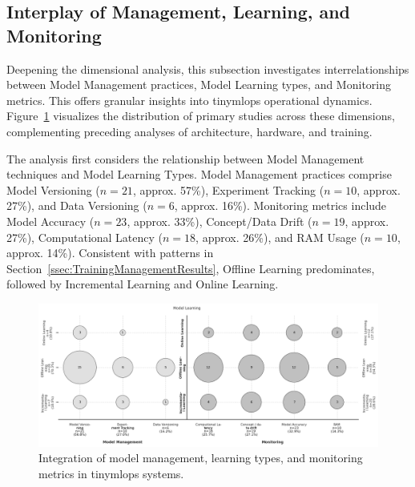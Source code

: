 \subsection{Interplay of Management, Learning, and Monitoring}
\label{ssec:ManagementLearningMonitoringResults}

Deepening the dimensional analysis, this subsection investigates interrelationships between Model Management practices, Model Learning types, and Monitoring metrics. This offers granular insights into \gls{tinymlops} operational dynamics. Figure~\ref{fig:bubble-chart-mgmt-learning-monitoring} visualizes the distribution of primary studies across these dimensions, complementing preceding analyses of architecture, hardware, and training.

The analysis first considers the relationship between Model Management techniques and Model Learning Types. Model Management practices comprise Model Versioning ($n=21$, approx. 57\%), Experiment Tracking ($n=10$, approx. 27\%), and Data Versioning ($n=6$, approx. 16\%). Monitoring metrics include Model Accuracy ($n=23$, approx. 33\%), Concept/Data Drift ($n=19$, approx. 27\%), Computational Latency ($n=18$, approx. 26\%), and RAM Usage ($n=10$, approx. 14\%). Consistent with patterns in Section~\ref{ssec:TrainingManagementResults}, Offline Learning predominates, followed by Incremental Learning and Online Learning.

\begin{figure}[htbp]
    \centering
    \includegraphics[width=1\textwidth]{figs/research_results/sms-learning-monitoring.png}
    \caption[Mapping of Model Management, Learning, and Monitoring]{Integration of model management, learning types, and monitoring metrics in \gls{tinymlops} systems.}
    \label{fig:bubble-chart-mgmt-learning-monitoring}
\end{figure}

